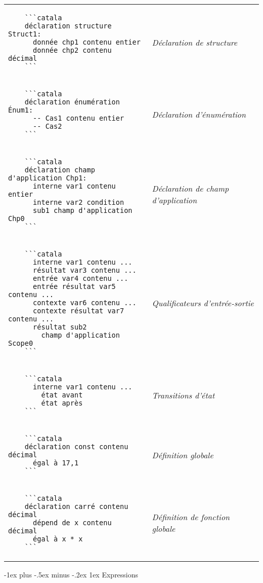 \documentclass{article}
\makeatletter
\newcommand\articlenormalsize{\fontsize{10pt}{12pt}\selectfont}
\renewcommand{\section}{\@startsection{section}{1}{0mm}%
                                {-1ex plus -.5ex minus -.2ex}%
                                {1ex}%
                                {\normalfont\articlenormalsize\bfseries}}
\newenvironment{catala}{%
  \VerbatimEnvironment
  \let\FV@ListVSpace\relax
  \begin{verbatim}}%
 {\end{verbatim}}
\makeatother
\begin{document}
\begin{multicols}{3}
\begin{tabular}{@{}p{\cola}>{\slshape}p{\colb}@{}}
  \begin{catala}
    ```catala
    déclaration structure Struct1:
      donnée chp1 contenu entier
      donnée chp2 contenu décimal
    ```
  \end{catala}
  & Déclaration de structure
  \\
  \begin{catala}
    ```catala
    déclaration énumération Énum1:
      -- Cas1 contenu entier
      -- Cas2
    ```
  \end{catala}
  & Déclaration d'énumération
  \\
  \begin{catala}
    ```catala
    déclaration champ d'application Chp1:
      interne var1 contenu entier
      interne var2 condition
      sub1 champ d'application Chp0
    ```
  \end{catala}
  & Déclaration de champ d'application
  \\
  \begin{catala}
    ```catala
      interne var1 contenu ...
      résultat var3 contenu ...
      entrée var4 contenu ...
      entrée résultat var5 contenu ...
      contexte var6 contenu ...
      contexte résultat var7 contenu ...
      résultat sub2
        champ d'application Scope0
    ```
  \end{catala}
  & Qualificateurs d'entrée-sortie
  \\
  \begin{catala}
    ```catala
      interne var1 contenu ...
        état avant
        état après
    ```
  \end{catala}
  & Transitions d'état
  \\
  \begin{catala}
    ```catala
    déclaration const contenu décimal
      égal à 17,1
    ```
  \end{catala}
  & Définition globale
  \\
  \begin{catala}
    ```catala
    déclaration carré contenu décimal
      dépend de x contenu décimal
      égal à x * x
    ```
  \end{catala}
  & Définition de fonction globale
  \\
\end{tabular}

\section{Expressions}


\end{multicols}
\end{document}
